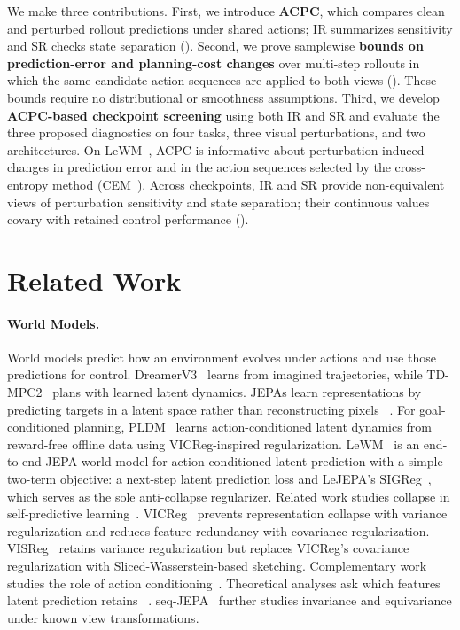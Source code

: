 We make three contributions. First, we introduce \textbf{ACPC}, which compares
clean and perturbed rollout predictions under shared actions; IR summarizes
sensitivity and SR checks state separation (). Second, we
prove samplewise \textbf{bounds on prediction-error and planning-cost changes}
over multi-step rollouts in which the same candidate action sequences are applied to both views
(). These bounds
require no distributional or smoothness assumptions. Third, we develop
\textbf{ACPC-based checkpoint screening} using both IR and SR and evaluate the three proposed diagnostics on four tasks, three visual perturbations, and two architectures.
On LeWM~\citep{maes2026lewm}, ACPC is informative about perturbation-induced changes in prediction error and in the action sequences selected by the cross-entropy method (CEM~\citep{kroese2006cem}). Across
checkpoints, IR and SR provide non-equivalent views of perturbation sensitivity
and state separation; their continuous values covary with retained
control performance ().

\section{Related Work}\label{sec:related}

\paragraph{World Models.}
World models predict how an environment evolves under actions and use those
predictions for control. DreamerV3~\citep{hafner2025dreamerv3} learns from
imagined trajectories, while TD-MPC2~\citep{hansen2024tdmpc2} plans with
learned latent dynamics. JEPAs
learn representations by predicting targets in a latent space rather
than reconstructing pixels
~\citep{lecun2022path,assran2023ijepa,bardes2024vjepa,assran2025vjepa2}.
For goal-conditioned planning, PLDM~\citep{sobal2025stresstesting} learns
action-conditioned latent dynamics from reward-free offline data using
VICReg-inspired regularization.
LeWM~\citep{maes2026lewm} is an end-to-end JEPA world model for
action-conditioned latent prediction with a simple two-term objective: a
next-step latent prediction loss and LeJEPA's SIGReg~\citep{balestriero2025lejepa}, which serves as the sole anti-collapse regularizer.
Related work studies collapse in self-predictive
learning~\citep{tang2023selfpredictive}.
VICReg~\citep{bardes2022vicreg} prevents representation collapse with variance regularization
and reduces feature redundancy with covariance regularization.
VISReg~\citep{wu2026visreg} retains variance regularization but
replaces VICReg's covariance regularization with Sliced-Wasserstein-based
sketching.
Complementary work studies the role of action
conditioning~\citep{khetarpal2025actionconditional}.
Theoretical analyses ask which features latent prediction retains
~\citep{vanassel2025jointembeddingreconstruction,littwin2024jepaavoidsnoisyfeatures}.
seq-JEPA~\citep{ghaemi2025seqjepa} further studies invariance and equivariance
under known view transformations.

